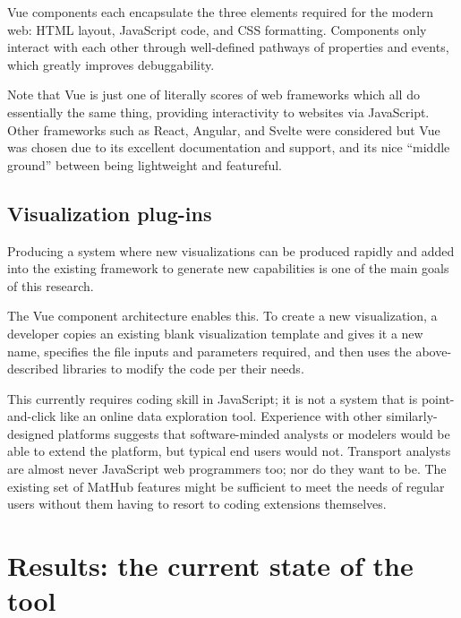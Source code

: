 Vue components each encapsulate the three elements required for the modern web: HTML layout, JavaScript code, and CSS formatting. Components only interact with each other through well-defined pathways of properties and events, which greatly improves debuggability.

Note that Vue is just one of literally scores of web frameworks which all do essentially the same thing, providing interactivity to websites via JavaScript. Other frameworks such as React, Angular, and Svelte were considered but Vue was chosen due to its excellent documentation and support, and its nice ``middle ground'' between being lightweight and featureful.

\hypertarget{mathub-visualization-plug-ins}{%
\subsection{Visualization plug-ins}\label{visualization-plug-ins}}

Producing a system where new visualizations can be produced rapidly and added into the existing framework to generate new capabilities is one of the main goals of this research.

The Vue component architecture enables this. To create a new visualization, a developer copies an existing blank visualization template and gives it a new name, specifies the file inputs and parameters required, and then uses the above-described libraries to modify the code per their needs.

This currently requires coding skill in JavaScript; it is not a system that is point-and-click like an online data exploration tool. Experience with other similarly-designed platforms suggests that software-minded analysts or modelers would be able to extend the platform, but typical end users would not. Transport analysts are almost never JavaScript web programmers too; nor do they want to be. The existing set of MatHub features might be sufficient to meet the needs of regular users without them having to resort to coding extensions themselves.

\hypertarget{mathub-results-the-current-state-of-the-tool}{%
\section{Results: the current state of the tool}\label{results-the-current-state-of-the-tool}}

